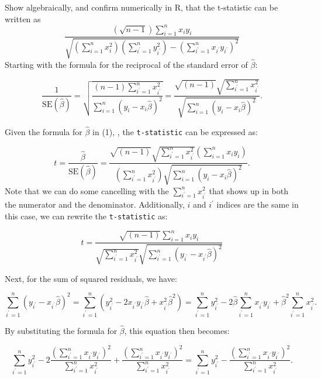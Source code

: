\documentclass[
]{article}
\begin{document}
Show algebraically, and confirm numerically in R, that the t-statistic
can be written as \[
\frac{(\sqrt{n-1}) \sum_{i=1}^{n} x_{i} y_{i}}{\sqrt{\left(\sum_{i=1}^{n} x_{i}^2\right)\left(\sum_{i^{\prime}=1}^{n} y_{i^{\prime}}^2\right)-\left(\sum_{i^{\prime}=1}^{n} x_{i^{\prime}} y_{i^{\prime}}\right)^2}} 
\] Starting with the formula for the reciprocal of the standard error of
\(\hat{\beta}\):

\[
    \frac{1}{\text{SE}(\hat{\beta})} = 
    \sqrt{\frac{(n - 1)\sum_{i^{\prime} = 1}^n x_{i^{\prime}}^2}{\sum_{i = 1}^n \left( y_i - x_i\hat{\beta} \right)^2}} =
    \frac{\sqrt{(n - 1)} \sqrt{\sum_{i^{\prime} = 1}^n x_{i^{\prime}}^2}}{\sqrt{\sum_{i = 1}^n \left( y_i - x_i\hat{\beta} \right)^2}}.
\]

Given the formula for \(\hat{\beta}\) in (1), , the \texttt{t-statistic}
can be expressed as:

\[
    t = \frac{\hat{\beta}}{\text{SE}(\hat{\beta})} = 
    \frac{\sqrt{(n - 1)} \sqrt{\sum_{i^{\prime} = 1}^n x_{i^{\prime}}^2} \left( \sum_{i = 1}^n x_iy_i \right)}
    {\left( \sum_{i^{\prime} = 1}^n x_{i^{\prime}}^2 \right) \sqrt{\sum_{i = 1}^n \left( y_i - x_i\hat{\beta} \right)^2}}.
\] Note that we can do some cancelling with the
\(\sum_{i^{\prime} = 1}^n x_{i^{\prime}}^2\) that shows up in both the
numerator and the denominator. Additionally, \(i\) and \(i^{\prime}\)
indices are the same in this case, we can rewrite the
\texttt{t-statistic} as:

\[
    t = \frac{\sqrt{(n - 1)} \sum_{i = 1}^n x_iy_i}
    {\sqrt{\sum_{i^{\prime} = 1}^n x_{i^{\prime}}^2} \sqrt{\sum_{i^{\prime} = 1}^n \left( y_{i^{\prime}} - x_{i^{\prime}}\hat{\beta} \right)^2}}
\]

Next, for the sum of squared residuals, we have:

\[
    \sum_{i^{\prime} = 1}^n \left( y_{i^{\prime}} - x_{i^{\prime}}\hat{\beta} \right)^2 = 
    \sum_{i^{\prime} = 1}^n \left( y_{i^{\prime}}^2 - 2x_{i^{\prime}}y_{i^{\prime}}\hat{\beta} + x_{i^{\prime}}^2\hat{\beta}^2 \right) = 
    \sum_{i^{\prime} = 1}^n y_{i^{\prime}}^2 - 2\hat{\beta}\sum_{i^{\prime} = 1}^n x_{i^{\prime}}y_{i^{\prime}} + \hat{\beta}^2\sum_{i^{\prime} = 1}^n x_{i^{\prime}}^2.
\]

By substituting the formula for \(\hat{\beta}\), this equation then
becomes:

\[
    \sum_{i^{\prime} = 1}^n y_{i^{\prime}}^2 - 2\frac{\left( \sum_{i^{\prime} = 1}^n x_{i^{\prime}}y_{i^{\prime}} \right)^2}{\sum_{i^{\prime} = 1}^n x_{i^{\prime}}^2}
    + \frac{\left( \sum_{i^{\prime} = 1}^n x_{i^{\prime}}y_{i^{\prime}} \right)^2}{\sum_{i^{\prime} = 1}^n x_{i^{\prime}}^2} = 
    \sum_{i^{\prime} = 1}^n y_{i^{\prime}}^2 - \frac{\left( \sum_{i^{\prime} = 1}^n x_{i^{\prime}}y_{i^{\prime}} \right)^2}{\sum_{i^{\prime} = 1}^n x_{i^{\prime}}^2}.
\]
\end{document}
